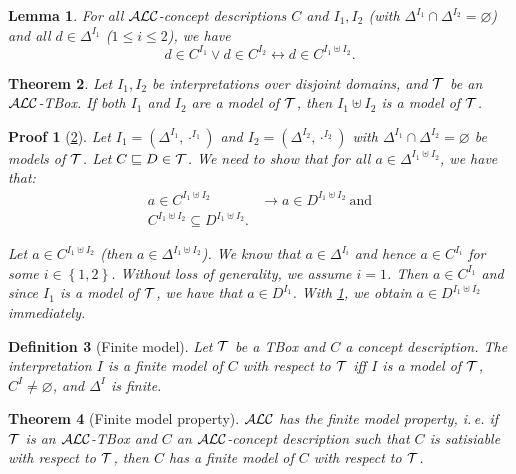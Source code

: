 \documentclass[openany]{scrbook}
\theoremstyle{break}
\newtheorem{Theorem}{Theorem}[chapter]
\newtheorem{Lemma}[Theorem]{Lemma}
\newtheorem{Definition}[Theorem]{Definition}
\theoremstyle{nonumberbreak}
\theoremstyle{nonumberplain}
\theoremstyle{nonumberbreak}
\newtheorem{Proof}{Proof}
\newcommand{\set}[1]{\left\{#1\right\}}
\newcommand{\ie}{i{.}\,e{.}\xspace}
\newcommand{\ALC}{{\cal A}{\cal L}{\cal C}}
\begin{document}
\begin{Lemma}
  \label{3.10}
  For all $\ALC$-concept descriptions $C$ and $I_1, I_2$ (with
  $\Delta^{I_1} \cap \Delta^{I_2} = \varnothing$) and all $d \in
  \Delta^{I_1}$ ($1 \leq i \leq 2$), we have
  \begin{equation*}
    d \in C^{I_1} \vee d \in C^{I_2} \longleftrightarrow d \in C^{I_1
      \uplus I_2}.
  \end{equation*}
\end{Lemma}

\begin{Theorem}
  \label{3.10b}
  Let $I_1, I_2$ be interpretations over disjoint domains, and ${\cal
    T}$ be an $\ALC$-TBox. If both $I_1$ and $I_2$ are a model of
  ${\cal T}$, then $I_1 \uplus I_2$ is a model of ${\cal T}$.
\end{Theorem}

\begin{Proof}[\cref{3.10b}]
  Let $I_1 = (\Delta^{I_1}, \cdot^{I_1})$ and $I_2 = (\Delta^{I_2},
  \cdot^{I_2})$ with $\Delta^{I_1} \cap \Delta^{I_2} = \varnothing$ be
  models of ${\cal T}$. Let $C \sqsubseteq D \in {\cal T}$. We need to
  show that for all $a \in \Delta^{I_1 \uplus I_2}$, we have that:
  \begin{align*}
    a \in C^{I_1 \uplus I_2} & \to a \in D^{I_1 \uplus I_2}\
    \text{and} \\
    C^{I_1 \uplus I_2} \subseteq D^{I_1 \uplus I_2}.
  \end{align*}

  Let $a \in C^{I_1 \uplus I_2}$ (then $a \in \Delta^{I_1 \uplus
    I_2}$). We know that $a \in \Delta^{I_i}$ and hence $a \in
  C^{I_i}$ for some $i \in \set{1, 2}$. Without loss of generality, we
  assume $i = 1$. Then $a \in C^{I_1}$ and since $I_1$ is a model of
  ${\cal T}$, we have that $a \in D^{I_1}$. With \cref{3.10}, we
  obtain $a \in D^{I_1 \uplus I_2}$ immediately.
\end{Proof}

\begin{Definition}[Finite model]
  \label{3.11}
  Let ${\cal T}$ be a TBox and $C$ a concept description. The
  interpretation $I$ is a finite model of $C$ with respect to ${\cal
    T}$ iff $I$ is a model of ${\cal T}$, $C^I \ne \varnothing$, and
  $\Delta^I$ is finite.
\end{Definition}

\begin{Theorem}[Finite model property]
  \label{3.12}
  $\ALC$ has the finite model property, \ie
  if ${\cal T}$ is an $\ALC$-TBox and $C$ an $\ALC$-concept
  description such that $C$ is satisiable with respect to ${\cal T}$,
  then $C$ has a finite model of $C$ with respect to ${\cal T}$.
\end{Theorem}
\end{document}
